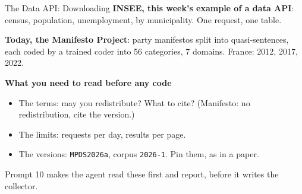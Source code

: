 \documentclass[svgnames,x11names,dvipsnames]{beamer}
\begin{document}
\begin{frame}{The Data API: Downloading}
\small
\textbf{INSEE, this week's example of a data API}: census, population, unemployment, by municipality. One request, one table.

\vspace{0.3cm}
\textbf{Today, the Manifesto Project}: party manifestos split into quasi-sentences, each coded by a trained coder into 56 categories, 7 domains. France: 2012, 2017, 2022.

\vspace{0.5cm}
\textbf{What you need to read before any code}
\begin{itemize}
    \setlength{\itemsep}{3pt}
    \item The terms: may you redistribute? What to cite? (Manifesto: no redistribution, cite the version.)
    \item The limits: requests per day, results per page.
    \item The versions: \texttt{MPDS2026a}, corpus \texttt{2026-1}. Pin them, as in a paper.
\end{itemize}

\vspace{0.3cm}
Prompt 10 makes the agent read these first and report, before it writes the collector.
\end{frame}
\end{document}

